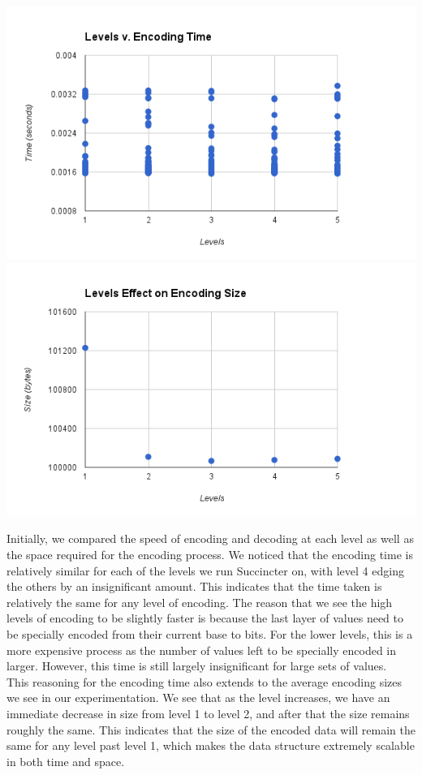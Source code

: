 \documentclass{article}
\begin{document}
\includegraphics[scale=0.4]{images/betterlevel_v_encode}
\includegraphics[scale=0.4]{images/lvl_encodingsize}
\afterpage{\vfill}

Initially, we compared the speed of encoding and decoding at each level as well as the space required for the encoding process. We noticed that the encoding time is relatively similar for each of the levels we run Succincter on, with level 4 edging the others by an insignificant amount. This indicates that the time taken is relatively the same for any level of encoding. The reason that we see the high levels of encoding to be slightly faster is because the last layer of values need to be specially encoded from their current base to bits. For the lower levels, this is a more expensive process as the number of values left to be specially encoded in larger. However, this time is still largely insignificant for large sets of values. \\

This reasoning for the encoding time also extends to the average encoding sizes we see in our experimentation. We see that as the level increases, we have an immediate decrease in size from level 1 to level 2, and after that the size remains roughly the same. This indicates that the size of the encoded data will remain the same for any level past level 1, which makes the data structure extremely scalable in both time and space. 
\end{document}
